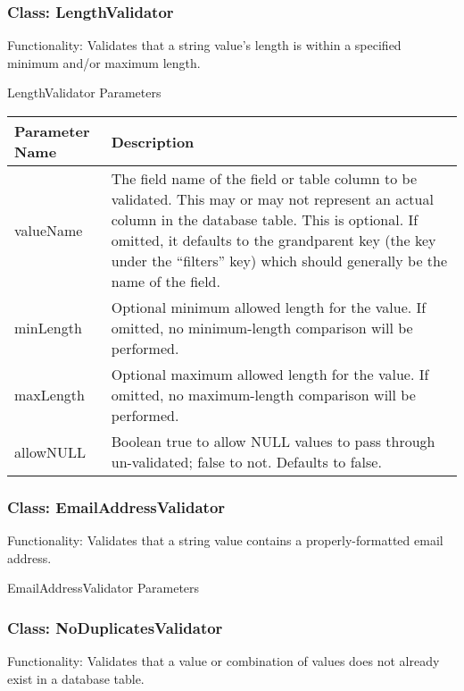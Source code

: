\documentclass[letterpaper,10pt,english]{sphinxmanual}
\begin{document}
\subsubsection{Class: LengthValidator}
\label{jaxFrameworkGuide:class-lengthvalidator}
Functionality: Validates that a string value's length is within a specified minimum and/or maximum
length.

LengthValidator Parameters

\begin{tabulary}{\linewidth}{|L|L|}
\hline
\textbf{
Parameter Name
} & \textbf{
Description
}\\\hline

valueName
 & 
The field name of the field or table column to be validated.  This may or may not
represent an actual column in the database table.  This is optional.  If omitted, it
defaults to the grandparent key (the key under the ``filters'' key) which should
generally be the name of the field.
\\\hline

minLength
 & 
Optional minimum allowed length for the value.  If omitted, no minimum-length
comparison will be performed.
\\\hline

maxLength
 & 
Optional maximum allowed length for the value.  If omitted, no maximum-length
comparison will be performed.
\\\hline

allowNULL
 & 
Boolean true to allow NULL values to pass through un-validated; false to not.
Defaults to false.
\\\hline
\end{tabulary}



\subsubsection{Class: EmailAddressValidator}
\label{jaxFrameworkGuide:class-emailaddressvalidator}
Functionality: Validates that a string value contains a properly-formatted email address.

EmailAddressValidator Parameters


\subsubsection{Class: NoDuplicatesValidator}
\label{jaxFrameworkGuide:class-noduplicatesvalidator}
Functionality: Validates that a value or combination of values does not already exist in a database
table.
\end{document}

